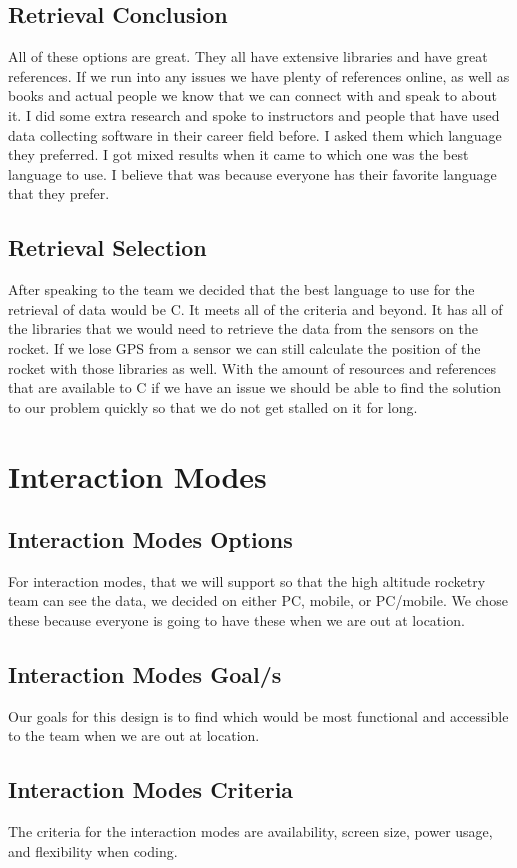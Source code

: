 \documentclass[10pt,draftclsnofoot,onecolumn]{IEEEtran}
\begin{document}
    \subsection{Retrieval Conclusion}
    All of these options are great. They all have extensive libraries and have great references.  If we run into any issues we have plenty of references online, as well as books and actual people we know that we can connect with and speak to about it.  I did some extra research and spoke to instructors and people that have used data collecting software in their career field before.  I asked them which language they preferred.  I got mixed results when it came to which one was the best language to use.  I believe that was because everyone has their favorite language that they prefer.  
     \subsection{Retrieval Selection}
      After speaking to the team we decided that the best language to use for the retrieval of data would be C.  It meets all of the criteria and beyond.  It has all of the libraries that we would need to retrieve the data from the sensors on the rocket.  If we lose GPS from a sensor we can still calculate the position of the rocket with those libraries as well.  With the amount of resources and references that are available to C if we have an issue we should be able to find the solution to our problem quickly so that we do not get stalled on it for long.  
     \section{Interaction Modes}
\subsection{Interaction Modes Options}
 For interaction modes, that we will support so that the high altitude rocketry team can see the data, we decided on either PC, mobile, or PC/mobile.  We chose these because everyone is going to have these when we are out at location.  

 \subsection{Interaction Modes Goal/s}
  Our goals for this design is to find which would be most functional and accessible to the team when we are out at location. 
  \subsection{Interaction Modes Criteria}
   The criteria for the interaction modes are availability, screen size, power usage, and flexibility when coding.  
\end{document}
